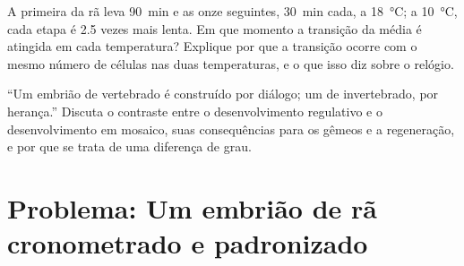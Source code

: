 \begin{exercise}[$\star\star\star$]\label{exo:b2:vertebrate-development:11}
A primeira  da rã leva \qty{90}{min} e as onze seguintes,
\qty{30}{min} cada, a \qty{18}{\celsius}; a \qty{10}{\celsius}, cada
etapa é 2.5 vezes mais lenta. Em que momento a transição da 
média é atingida em cada temperatura? Explique por que a transição
ocorre com o mesmo número de células nas duas temperaturas, e o que
isso diz sobre o relógio.
\end{exercise}

\begin{exercise}[$\star\star\star$]\label{exo:b2:vertebrate-development:12}
``Um embrião de vertebrado é construído por diálogo; um de invertebrado,
por herança.'' Discuta o contraste entre o desenvolvimento regulativo e
o desenvolvimento em mosaico, suas consequências para os gêmeos e a
regeneração, e por que se trata de uma diferença de grau.
\end{exercise}

\section{Problema: Um embrião de rã cronometrado e padronizado}

